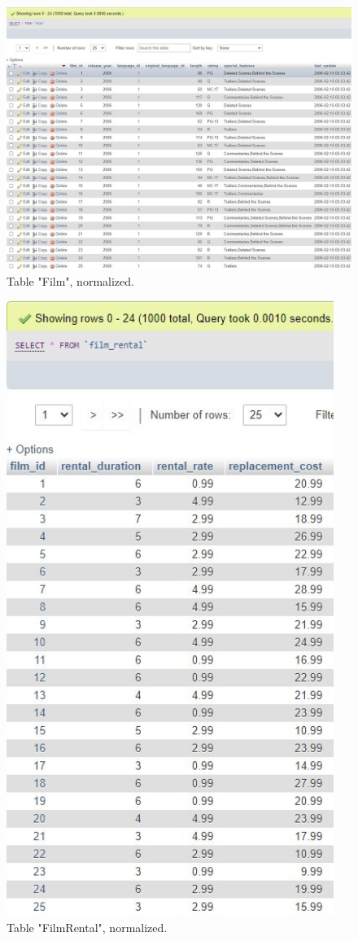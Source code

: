 \documentclass{article}
\begin{document}
		\begin{figure}[H]
			\includegraphics[width=\textwidth]{table_film_norm}
			\caption{Table "Film", normalized.}
		\end{figure}
		\begin{figure}[H]
			\includegraphics[height = 20cm]{table_filmrental_norm}
			\caption{Table "Film\textunderscore Rental", normalized.}
		\end{figure}
\end{document}
